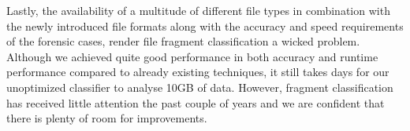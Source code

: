 Lastly, the availability of a multitude of different file types in combination with the newly introduced file formats along with the accuracy and speed requirements of the forensic cases, render file fragment classification a wicked problem. Although we achieved quite good performance in both accuracy and runtime performance compared to already existing techniques, it still takes days for our unoptimized classifier to analyse 10GB of data. However, fragment classification has received little attention the past couple of years and we are confident that there is plenty of room for improvements. 

